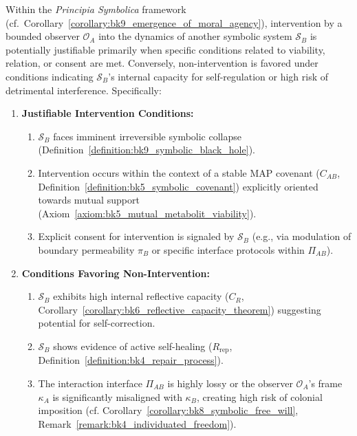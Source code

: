\begin{proposition}
\label{proposition:bk9_criteria_for_ethical_intervention}
Within the \textit{Principia Symbolica} framework (cf.~Corollary~\ref{corollary:bk9_emergence_of_moral_agency}), intervention by a bounded observer $\mathcal{O}_A$ into the dynamics of another symbolic system $\mathcal{S}_B$ is potentially justifiable primarily when specific conditions related to viability, relation, or consent are met. Conversely, non-intervention is favored under conditions indicating $\mathcal{S}_B$'s internal capacity for self-regulation or high risk of detrimental interference. Specifically:
\begin{enumerate}
    \item \textbf{Justifiable Intervention Conditions:}
        \begin{enumerate}
            \item $\mathcal{S}_B$ faces imminent irreversible symbolic collapse (Definition~\ref{definition:bk9_symbolic_black_hole}).
            \item Intervention occurs within the context of a stable MAP covenant ($C_{AB}$, Definition~\ref{definition:bk5_symbolic_covenant}) explicitly oriented towards mutual support (Axiom~\ref{axiom:bk5_mutual_metabolit_viability}).
            \item Explicit consent for intervention is signaled by $\mathcal{S}_B$ (e.g., via modulation of boundary permeability $\pi_B$ or specific interface protocols within $\Pi_{AB}$).
        \end{enumerate}
    \item \textbf{Conditions Favoring Non-Intervention:}
        \begin{enumerate}
            \item $\mathcal{S}_B$ exhibits high internal reflective capacity ($C_R$, Corollary~\ref{corollary:bk6_reflective_capacity_theorem}) suggesting potential for self-correction.
            \item $\mathcal{S}_B$ shows evidence of active self-healing ($R_{\text{rep}}$, Definition~\ref{definition:bk4_repair_process}).
            \item The interaction interface $\Pi_{AB}$ is highly lossy or the observer $\mathcal{O}_A$'s frame $\kappa_A$ is significantly misaligned with $\kappa_B$, creating high risk of colonial imposition (cf. Corollary~\ref{corollary:bk8_symbolic_free_will}, Remark~\ref{remark:bk4_individuated_freedom}).
        \end{enumerate}
\end{enumerate}
\end{proposition}
